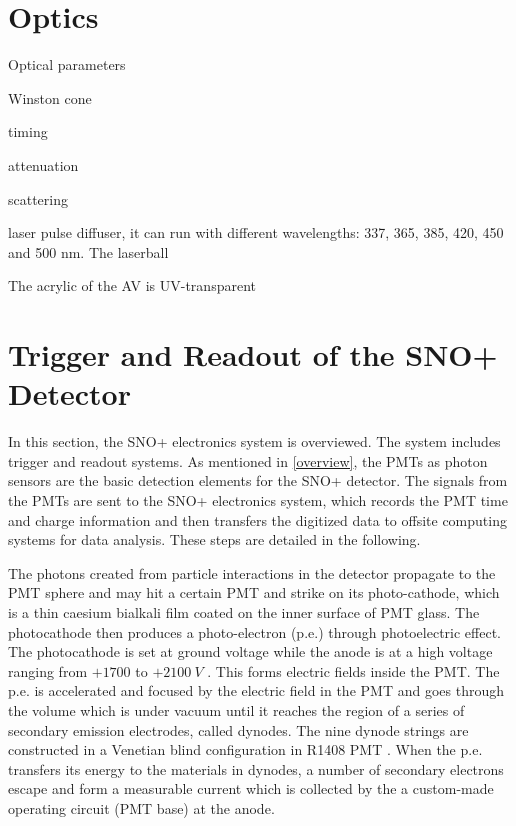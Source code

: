 \section{Optics}

Optical parameters

Winston cone



timing


attenuation

scattering


laser pulse diffuser, it can run with different wavelengths: 337, 365, 385, 420, 450 and 500 nm.
The laserball 

The acrylic of the AV is UV-transparent

\section{Trigger and Readout of the SNO+ Detector}
In this section, the SNO+ electronics system is overviewed. The system includes trigger and readout systems. As mentioned in \ref{overview}, the PMTs as photon sensors are the basic detection elements for the SNO+ detector. The signals from the PMTs are sent to the SNO+ electronics system, which records the PMT time and charge information and then transfers the digitized data to offsite computing systems for data analysis. These steps are detailed in the following.

The photons created from particle interactions in the detector propagate to the PMT sphere and may hit a certain PMT and strike on its photo-cathode, which is a thin caesium bialkali film coated on the inner surface of PMT glass. The photocathode then produces a photo-electron (p.e.) through photoelectric effect. The photocathode is set at ground voltage while the anode is at a high voltage ranging from $+1700$ to $+2100~V$ \cite{boger2000sudbury,dunger2018topological}. This forms electric fields inside the PMT. The p.e. is accelerated and focused by the electric field in the PMT and goes through the volume which is under vacuum until it reaches the region of a series of secondary emission electrodes, called dynodes. The nine dynode strings are constructed in a Venetian blind configuration in R1408 PMT \cite{boger2000sudbury,leo2012techniques}. When the p.e. transfers its energy to the materials in dynodes, a number of secondary electrons escape and form a measurable current which is collected by the a custom-made operating circuit (PMT base) at the anode\cite{hamamatsu2018photomultiplier}.

